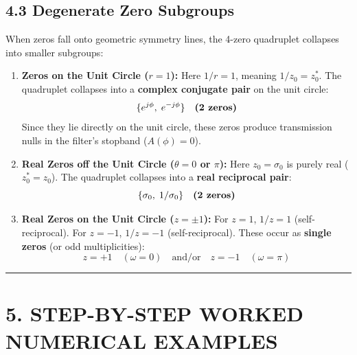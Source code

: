 \documentclass[11pt,a4paper]{article}
\begin{document}
\subsection{4.3 Degenerate Zero Subgroups}
When zeros fall onto geometric symmetry lines, the 4-zero quadruplet collapses into smaller subgroups:
\begin{enumerate}
    \item \textbf{Zeros on the Unit Circle ($r = 1$):}
    Here $1/r = 1$, meaning $1/z_0 = z_0^*$. The quadruplet collapses into a \textbf{complex conjugate pair} on the unit circle:
    \begin{equation}
    \{e^{j\phi}, \; e^{-j\phi}\} \quad \text{\textbf{(2 zeros)}}
    \end{equation}
    Since they lie directly on the unit circle, these zeros produce transmission nulls in the filter's stopband ($A(\phi) = 0$).
    
    \item \textbf{Real Zeros off the Unit Circle ($\theta = 0$ or $\pi$):}
    Here $z_0 = \sigma_0$ is purely real ($z_0^* = z_0$). The quadruplet collapses into a \textbf{real reciprocal pair}:
    \begin{equation}
    \{\sigma_0, \; 1/\sigma_0\} \quad \text{\textbf{(2 zeros)}}
    \end{equation}
    
    \item \textbf{Real Zeros on the Unit Circle ($z = \pm 1$):}
    For $z = 1$, $1/z = 1$ (self-reciprocal). For $z = -1$, $1/z = -1$ (self-reciprocal). These occur as \textbf{single zeros} (or odd multiplicities):
    \begin{equation}
    z = +1 \quad (\omega = 0) \quad \text{and/or} \quad z = -1 \quad (\omega = \pi)
    \end{equation}
\end{enumerate}

\noindent\rule{\textwidth}{0.5pt}

\section{5. STEP-BY-STEP WORKED NUMERICAL EXAMPLES}
\end{document}
